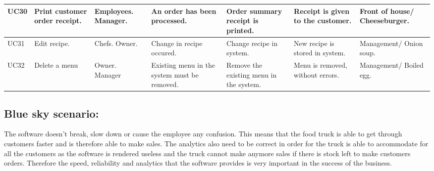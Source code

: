 \begin{table}[H]
\begin{tabularx}{\linewidth}{|X|X|X|X|X|X|X|}
\hline
UC30 & Print customer order receipt. & Employees. Manager. & An order has been processed. & Order summary receipt is printed. & Receipt is given to the customer. & Front of house/ Cheeseburger. \\
\hline
UC31 & Edit recipe. & Chefs. Owner. & Change in recipe occured. & Change recipe in system. & New recipe is stored in system. & Management/ Onion soup. \\
\hline
UC32 & Delete a menu & Owner. Manager & Existing menu in the system must be removed. & Remove the existing menu in the system. & Menu is removed, without errors. & Management/ Boiled egg. \\
\hline
\end{tabularx}
\end{table}
\pagebreak
\subsection{Blue sky scenario:}
The software doesn’t break, slow down or cause the employee any confusion. This means that the food truck is able to get through customers faster and is therefore able to make sales. The analytics  also need to be correct in order for the truck is able to accommodate for all the customers as the software is rendered useless and the truck cannot make anymore sales if there is stock left to make customers orders. Therefore the speed, reliability and analytics that the software provides is very important in the success of the business.

